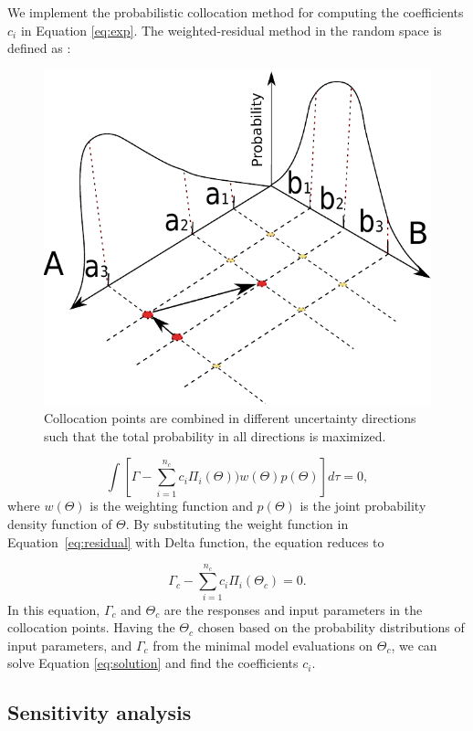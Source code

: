 We implement the probabilistic collocation method for computing the
coefficients $c_i$ in Equation \ref{eq:exp}. The weighted-residual method in
the random space is defined as \cite{nLi2007}:

\begin{figure}
  \centering
  \includegraphics[width=0.65 \linewidth]{./figurer/col} 
  \caption{Collocation points are combined in different uncertainty directions
such that the total probability in all directions is maximized.}
  \label{fig:col}
%
\end{figure}

\begin{equation}
\int\left[\Gamma-\underset{i=1}{\overset{n_c}{\sum}}c_{i}\Pi_{i}
(\Theta))w(\Theta)p(\Theta)\right]d\tau=0,\label{eq:residual}
\end{equation}
where $w(\Theta)$ is the weighting function and $p(\Theta)$ is the joint
probability density function of $\Theta$. By substituting the weight function in
Equation~\ref{eq:residual} with  Delta function, the equation reduces to

\begin{equation}
 \Gamma_{c}-\underset{i=1}{\overset{n_c}{\sum}c_{i}}\Pi_{i}(\Theta_{c})=0.
\label{eq:solution}
\end{equation} In this equation, $\Gamma_c$ and $\Theta_c$ are the responses and
input parameters in the collocation points. Having the $\Theta_c$ chosen based
on the probability distributions of input parameters, and $\Gamma_c$ from the
minimal model evaluations on $\Theta_c$, we can solve Equation
\ref{eq:solution} and find the coefficients $c_i$.

\subsection{Sensitivity analysis}
\label{Section:SA}

